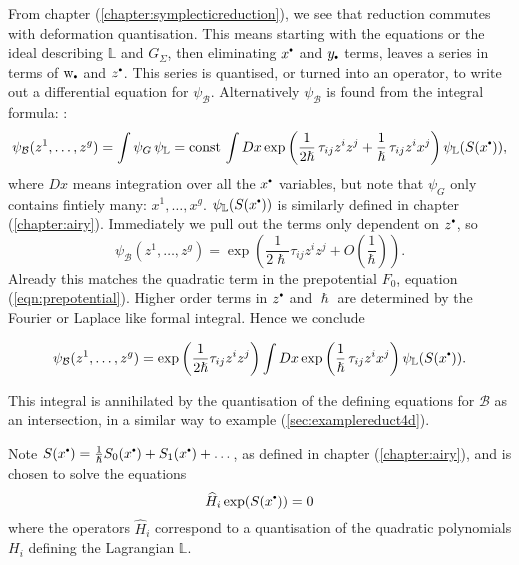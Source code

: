     From chapter (\ref{chapter:symplecticreduction}), we see that reduction commutes with deformation quantisation. This means starting with the equations or the ideal describing \( \mathbb{L}\) and \(G_\Sigma\), then eliminating \(x^{\sbt}\) and \(y_{\sbt}\) terms, leaves a series in terms of \(\w_{\sbt}\) and \(z^{\sbt}\). This series is quantised, or turned into an operator, to write out a differential equation for \( \psi_{\mathcal{B}}\). Alternatively \( \psi_{\mathcal{B}}\) is found from the integral formula: \cite{ks_airy}:
    \[ \psi_{\mathcal{B}}(z^1, \dots, z^g ) = \int \psi_G \, \psi_{\mathbb{L}} = \mathrm{const} \, \int Dx \exp\left( \frac{1}{2 \hslash}\, \tau_{ij} z^i z^j +  \frac{1}{\hslash} \, \tau_{ij} z^i x^j  \right) \psi_{\mathbb{L}}( S(x^{\sbt}) ),\]
    where \( Dx \) means integration over all the \(x^{\sbt}\) variables, but note that \( \psi_G\) only contains fintiely many: \(x^1, \dots , x^g\).  \(\psi_{\mathbb{L}}( S(x^{\sbt}) )\) is similarly defined in chapter (\ref{chapter:airy}). Immediately we pull out the terms only dependent on \(z^{\sbt}\), so
    \[ \psi_{\mathcal{B}}(z^1, \dots, z^g ) = \exp\left( \frac{1}{2 \hslash } \tau_{ij} z^i z^j + O\left(\frac{1}{\hslash}\right) \right). \]
    Already this matches the quadratic term in the prepotential \(F_0\), equation (\ref{eqn:prepotential}).
    Higher order terms in \(z^{\sbt}\) and \(\hslash\) are determined by the Fourier or Laplace like formal integral. Hence we conclude
    \begin{prop}
    \label{prop:fourierB}
    \begin{align} \psi_{\mathcal{B}}(z^1, \dots, z^g ) =  \exp\left( \frac{1}{2 \hslash } \tau_{ij} z^i z^j \right) \int Dx \exp\left( \frac{1}{\hslash} \, \tau_{ij} z^i x^j  \right) \psi_{\mathbb{L}}( S(x^{\sbt}) ).
    \end{align}
    \end{prop}
    This integral is annihilated by the quantisation of the defining equations for \( \mathcal{B}\) as an intersection, in a similar way to example (\ref{sec:examplereduct4d}).

    Note \( S(x^{\sbt} ) = \frac{1}{\hslash }S_0(x^{\sbt}) + S_1(x^{\sbt}) + \dots\), as defined in chapter (\ref{chapter:airy}), and is chosen to solve the equations
    \[ \widehat{H}_i \exp( S(x^{\sbt})) = 0\]
    where the operators \( \widehat{H}_i \) correspond to a quantisation of the quadratic polynomials \(H_i\) defining the Lagrangian \( \mathbb{L}\).
    
